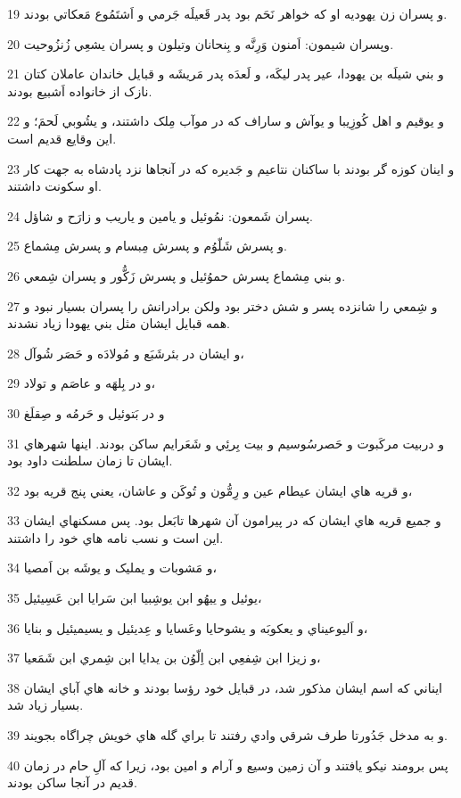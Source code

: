 \par 19 و پسران زن يهوديه او که خواهر نَحَم بود پدر قَعيلَه جَرمي و اَشتَمُوع مَعکاتي بودند.
\par 20 وپسران شيمون: اَمنون وَرِنَّه و بِنحانان وتيلون و پسران يشعِي زُنزُوحيت.
\par 21 و بني شيلَه بن يهودا، عير پدر ليکَه، و لَعدَه پدر مَريشَه و قبايل خاندان عاملان کتان نازک از خانواده اَشبيع بودند.
\par 22 و يوقيم و اهل کُوزِيبا و يوآش و ساراف که در موآب مِلک داشتند، و يشُوبي لَحمَ؛ و اين وقايع قديم است.
\par 23 و اينان کوزه گر بودند با ساکنان نتاعيم و جَديره که در آنجاها نزد پادشاه به جهت کار او سکونت داشتند.
\par 24 پسران شَمعون: نمُوئيل و يامين و ياريب و زارَح و شاؤل.
\par 25 و پسرش شَلّوُم و پسرش مِبسام و پسرش مِشماع.
\par 26 و بني مِشماع پسرش حموُئيل و پسرش زَکُّور و پسران شِمعي.
\par 27 و شِمعي را شانزده پسر و شش دختر بود ولکن برادرانش را پسران بسيار نبود و همه قبايل ايشان مثل بني يهودا زياد نشدند.
\par 28 و ايشان در بئرشَبَع و مُولادَه و حَصَر شُوآل،
\par 29 و در بِلهَه و عاصَم و تولاد،
\par 30 و در بَتوئيل و حَرمُه و صِقلَغ
\par 31 و دربيت مرکَبوت و حَصرسُوسيم و بيت بِرئِي و شَعَرايم ساکن بودند. اينها شهرهاي ايشان تا زمان سلطنت داود بود.
\par 32 و قريه هاي ايشان عيطام عين و رِمُّون و تُوکَن و عاشان، يعني پنج قريه بود،
\par 33 و جميع قريه هاي ايشان که در پيرامون آن شهرها تابَعل بود. پس مسکنهاي ايشان اين است و نسب نامه هاي خود را داشتند.
\par 34 و مَشوبات و يمليک و يوشَه بن اَمصيا،
\par 35 يوئيل و ييهُو ابن يوشِبيا ابن سَرايا ابن عَسِيئيل،
\par 36 و اَليوعيناي و يعکوبَه و يشوحايا وعَسايا و عِديئيل و يسيميئيل و بنايا،
\par 37 و زيزا ابن شِفعِي ابن اِلّوُن بن يدايا ابن شِمري ابن شَمَعيا،
\par 38 ايناني که اسم ايشان مذکور شد، در قبايل خود رؤسا بودند و خانه هاي آباي ايشان بسيار زياد شد.
\par 39 و به مدخل جَدُورتا طرف شرقي وادي رفتند تا براي گله هاي خويش چراگاه بجويند.
\par 40 پس برومند نيکو يافتند و آن زمين وسيع و آرام و امين بود، زيرا که آلِ حام در زمان قديم در آنجا ساکن بودند.
